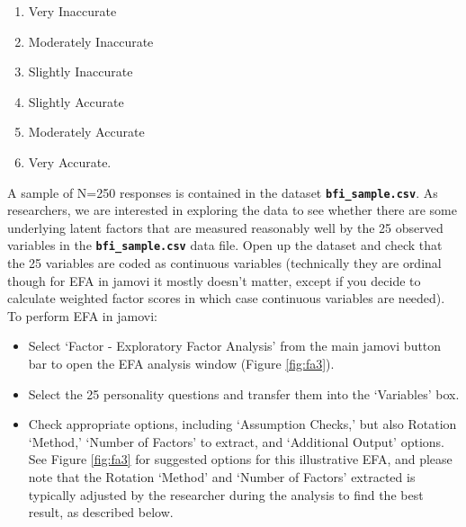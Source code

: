 \documentclass[
]{book}
\providecommand{\tightlist}{%
  \setlength{\itemsep}{0pt}\setlength{\parskip}{0pt}}
\begin{document}
\begin{enumerate}
\def\labelenumi{\arabic{enumi}.}
\tightlist
\item
  Very Inaccurate
\item
  Moderately Inaccurate
\item
  Slightly Inaccurate
\item
  Slightly Accurate
\item
  Moderately Accurate
\item
  Very Accurate.
\end{enumerate}

A sample of N=250 responses is contained in the dataset \textbf{\texttt{bfi\_sample.csv}}. As researchers, we are interested in exploring the data to see whether there are some underlying latent factors that are measured reasonably well by the 25 observed variables in the \textbf{\texttt{bfi\_sample.csv}} data file. Open up the dataset and check that the 25 variables are coded as continuous variables (technically they are ordinal though for EFA in jamovi it mostly doesn't matter, except if you decide to calculate weighted factor scores in which case continuous variables are needed). To perform EFA in jamovi:

\begin{itemize}
\tightlist
\item
  Select `Factor - Exploratory Factor Analysis' from the main jamovi button bar to open the EFA analysis window (Figure \ref{fig:fa3}).
\item
  Select the 25 personality questions and transfer them into the `Variables' box.
\item
  Check appropriate options, including `Assumption Checks,' but also Rotation `Method,' `Number of Factors' to extract, and `Additional Output' options. See Figure \ref{fig:fa3} for suggested options for this illustrative EFA, and please note that the Rotation `Method' and `Number of Factors' extracted is typically adjusted by the researcher during the analysis to find the best result, as described below.
\end{itemize}
\end{document}
